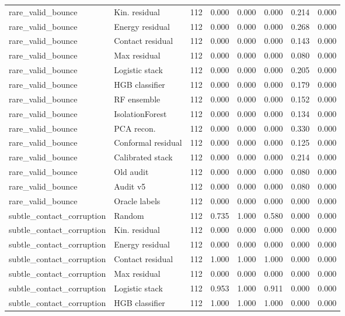 {\begin{longtable}{llrrrrrr}
rare\_valid\_bounce & Kin. residual & 112 & 0.000 & 0.000 & 0.000 & 0.214 & 0.000 \\
rare\_valid\_bounce & Energy residual & 112 & 0.000 & 0.000 & 0.000 & 0.268 & 0.000 \\
rare\_valid\_bounce & Contact residual & 112 & 0.000 & 0.000 & 0.000 & 0.143 & 0.000 \\
rare\_valid\_bounce & Max residual & 112 & 0.000 & 0.000 & 0.000 & 0.080 & 0.000 \\
rare\_valid\_bounce & Logistic stack & 112 & 0.000 & 0.000 & 0.000 & 0.205 & 0.000 \\
rare\_valid\_bounce & HGB classifier & 112 & 0.000 & 0.000 & 0.000 & 0.179 & 0.000 \\
rare\_valid\_bounce & RF ensemble & 112 & 0.000 & 0.000 & 0.000 & 0.152 & 0.000 \\
rare\_valid\_bounce & IsolationForest & 112 & 0.000 & 0.000 & 0.000 & 0.134 & 0.000 \\
rare\_valid\_bounce & PCA recon. & 112 & 0.000 & 0.000 & 0.000 & 0.330 & 0.000 \\
rare\_valid\_bounce & Conformal residual & 112 & 0.000 & 0.000 & 0.000 & 0.125 & 0.000 \\
rare\_valid\_bounce & Calibrated stack & 112 & 0.000 & 0.000 & 0.000 & 0.214 & 0.000 \\
rare\_valid\_bounce & Old audit & 112 & 0.000 & 0.000 & 0.000 & 0.080 & 0.000 \\
rare\_valid\_bounce & Audit v5 & 112 & 0.000 & 0.000 & 0.000 & 0.080 & 0.000 \\
rare\_valid\_bounce & Oracle labels & 112 & 0.000 & 0.000 & 0.000 & 0.000 & 0.000 \\
subtle\_contact\_corruption & Random & 112 & 0.735 & 1.000 & 0.580 & 0.000 & 0.000 \\
subtle\_contact\_corruption & Kin. residual & 112 & 0.000 & 0.000 & 0.000 & 0.000 & 0.000 \\
subtle\_contact\_corruption & Energy residual & 112 & 0.000 & 0.000 & 0.000 & 0.000 & 0.000 \\
subtle\_contact\_corruption & Contact residual & 112 & 1.000 & 1.000 & 1.000 & 0.000 & 0.000 \\
subtle\_contact\_corruption & Max residual & 112 & 0.000 & 0.000 & 0.000 & 0.000 & 0.000 \\
subtle\_contact\_corruption & Logistic stack & 112 & 0.953 & 1.000 & 0.911 & 0.000 & 0.000 \\
subtle\_contact\_corruption & HGB classifier & 112 & 1.000 & 1.000 & 1.000 & 0.000 & 0.000 \\

\end{longtable}}
